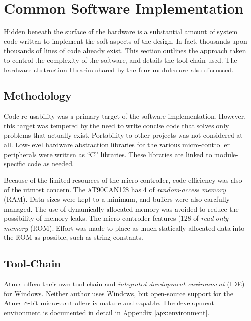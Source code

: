 \section{Common Software Implementation\label{sec:common_software_implementation}}

Hidden beneath the surface of the hardware is a substantial amount of system code written to implement the soft aspects of the design. In fact, thousands upon thousands of lines of code already exist. This section outlines the approach taken to control the complexity of the software, and details the tool-chain used. The hardware abstraction libraries shared by the four modules are also discussed.

\subsection{Methodology}
\label{sec:imp_software_meth}

Code re-usability was a primary target of the software implementation. However, this target was tempered by the need to write concise code that solves only problems that actually exist. Portability to other projects was not considered at all. Low-level hardware abstraction libraries for the various micro-controller peripherals were written as ``C'' libraries. These libraries are linked to module-specific code as needed. 


Because of the limited resources of the micro-controller, code efficiency was also of the utmost concern. The AT90CAN128 has \unit{4}{\kilo\byte} of \emph{random-access memory} (RAM). Data sizes were kept to a minimum, and buffers were also carefully managed. The use of dynamically allocated memory was avoided to reduce the possibility of memory leaks. The micro-controller features (\unit{128}{\kilo\byte} of \emph{read-only memory} (ROM). Effort was made to place as much statically allocated data into the ROM as possible, such as string constants.

\subsection{Tool-Chain}

Atmel offers their own tool-chain and \emph{integrated development environment} (IDE) for Windows. Neither author uses Windows, but open-source support for the Atmel 8-bit micro-controllers is mature and capable. The development environment is documented in detail in Appendix \ref{apx:environment}.

